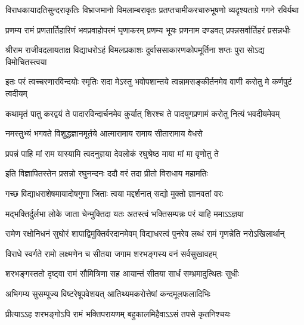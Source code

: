 \fourlineindentedshloka
{विराधकायादतिसुन्दराकृतिः}
{विभ्राजमानो विमलाम्बरावृतः}
{प्रतप्तचामीकरचारुभूषणो}
{व्यदृश्यताग्रे गगने रविर्यथा} %

\fourlineindentedshloka
{प्रणम्य रामं प्रणतार्तिहारिणं}
{भवप्रवाहोपरमं घृणाकरम्}
{प्रणम्य भूयः प्रणनाम दण्डवत्}
{प्रपन्नसर्वार्तिहरं प्रसन्नधीः} %


\fourlineindentedshloka
{श्रीराम राजीवदलायताक्ष}
{विद्याधरोऽहं विमलप्रकाशः}
{दुर्वाससाकारणकोपमूर्तिना}
{शप्तः पुरा सोऽद्य विमोचितस्त्वया} %

\fourlineindentedshloka
{इतः परं त्वच्चरणारविन्दयोः}
{स्मृतिः सदा मेऽस्तु भवोपशान्तये}
{त्वन्नामसङ्कीर्तनमेव वाणी}
{करोतु मे कर्णपुटं त्वदीयम्} %

\fourlineindentedshloka
{कथामृतं पातु करद्वयं ते}
{पादारविन्दार्चनमेव कुर्यात्}
{शिरश्च ते पादयुगप्रणामं}
{करोतु नित्यं भवदीयमेवम्} %

\twolineshloka
{नमस्तुभ्यं भगवते विशुद्धज्ञानमूर्तये}
{आत्मारामाय रामाय सीतारामाय वेधसे} %

\twolineshloka
{प्रपन्नं पाहि मां राम यास्यामि त्वदनुज्ञया}
{देवलोकं रघुश्रेष्ठ माया मां मा वृणोतु ते} %

\twolineshloka
{इति विज्ञापितस्तेन प्रसन्नो रघुनन्दनः}
{ददौ वरं तदा प्रीतो विराधाय महामतिः} %

\twolineshloka
{गच्छ विद्याधराशेषमायादोषगुणा जिताः}
{त्वया मद्दर्शनात् सद्यो मुक्तो ज्ञानवतां वरः} %

\twolineshloka
{मद्भक्तिर्दुर्लभा लोके जाता चेन्मुक्तिदा यतः}
{अतस्त्वं भक्तिसम्पन्नः परं याहि ममाऽऽज्ञया} %

\fourlineindentedshloka
{रामेण रक्षोनिधनं सुघोरं}
{शापाद्विमुक्तिर्वरदानमेवम्}
{विद्याधरत्वं पुनरेव लब्धं}
{रामं गृणन्नेति नरोऽखिलार्थान्} %






\twolineshloka
{विराधे स्वर्गते रामो लक्ष्मणेन च सीतया}
{जगाम शरभङ्गस्य वनं सर्वसुखावहम्} %

\twolineshloka
{शरभङ्गस्ततो दृष्ट्वा रामं सौमित्रिणा सह}
{आयान्तं सीतया सार्धं सम्भ्रमादुत्थितः सुधीः} %

\twolineshloka
{अभिगम्य सुसम्पूज्य विष्टरेषूपवेशयत्}
{आतिथ्यमकरोत्तेषां कन्दमूलफलादिभिः} %

\twolineshloka
{प्रीत्याऽऽह शरभङ्गोऽपि रामं भक्तिपरायणम्}
{बहुकालमिहैवाऽऽसं तपसे कृतनिश्चयः} %

